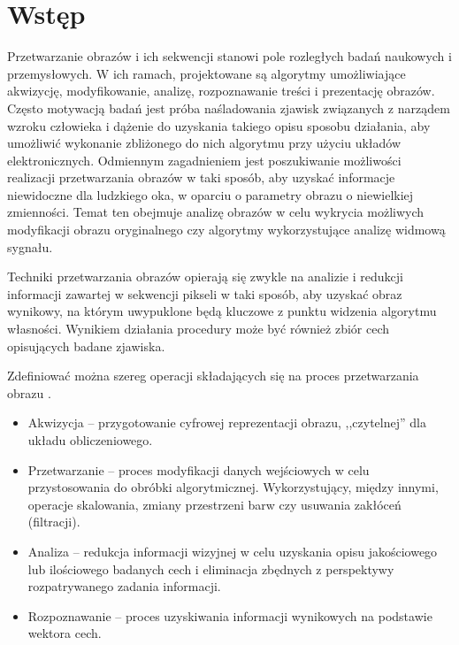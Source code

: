 \chapter{Wstęp}
\label{cha:intruduction}


Przetwarzanie obrazów i ich sekwencji stanowi pole rozległych badań naukowych i przemysłowych.
W ich ramach, projektowane są algorytmy umożliwiające akwizycję, modyfikowanie, analizę, rozpoznawanie treści i prezentację obrazów.
Często motywacją badań jest próba naśladowania zjawisk związanych z narządem wzroku człowieka i dążenie do uzyskania takiego opisu sposobu działania, aby umożliwić wykonanie zbliżonego do nich algorytmu przy użyciu układów elektronicznych. 
Odmiennym zagadnieniem jest poszukiwanie możliwości realizacji przetwarzania obrazów w taki sposób, aby uzyskać informacje niewidoczne dla ludzkiego oka, w oparciu o parametry obrazu o niewielkiej zmienności. Temat ten obejmuje analizę obrazów w celu wykrycia możliwych modyfikacji obrazu oryginalnego czy algorytmy wykorzystujące analizę widmową sygnału. %

Techniki przetwarzania obrazów opierają się zwykle na analizie i redukcji informacji zawartej w sekwencji pikseli w taki sposób, aby uzyskać obraz wynikowy, na którym uwypuklone będą kluczowe z punktu widzenia algorytmu własności.
Wynikiem działania procedury może być również zbiór cech opisujących badane zjawiska.

Zdefiniować można szereg operacji składających się na proces przetwarzania obrazu \cite{Tadeusiewicz1997}.
\begin{itemize}
	\item Akwizycja -- przygotowanie cyfrowej reprezentacji obrazu, ,,czytelnej'' dla układu obliczeniowego.
	
	\item Przetwarzanie -- proces modyfikacji danych wejściowych w celu przystosowania do obróbki algorytmicznej. Wykorzystujący, między innymi, operacje skalowania, zmiany przestrzeni barw czy usuwania zakłóceń (filtracji).
	
	\item Analiza -- redukcja informacji wizyjnej w celu uzyskania opisu jakościowego lub ilościowego badanych cech i eliminacja zbędnych z perspektywy rozpatrywanego zadania informacji.
	
	\item Rozpoznawanie -- proces uzyskiwania informacji wynikowych na podstawie wektora cech.
\end{itemize}

